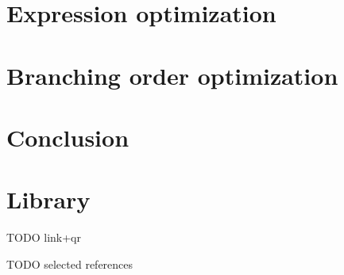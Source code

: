 \documentclass[myposter,portrait]{sciposter}
\def\mysection#1{
{\color{sectionCol}\section*{\sc\bfseries #1}}}
\begin{document}
\begin{multicols*}{3}
%
%      

\mysection{Expression optimization}



\mysection{Branching order optimization}

\mysection{Conclusion}

\mysection{Library}
TODO link+qr

TODO selected references


\end{multicols*}
\end{document}
